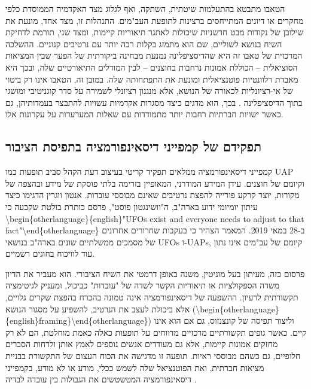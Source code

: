 \documentclass[12pt,a4paper]{article}
\begin{document}
הטאבו מתבטא בהתעלמות שיטתית, השתקה, ואף לגלוג מצד האקדמיה הממוסדת כלפי מחקרים או דיונים המתייחסים ברצינות לתופעת העב"מים. התנהלות זו, מצד אחד, מונעת את שילובן של נקודות מבט חדשניות שיכולות לאתגר תיאוריות קיימות, ומצד שני, תורמת לדחיקת השיח בנושא לשוליים, שם הוא מתמזג בקלות רבה יותר עם נרטיבים קנוניים. ההשלכה המרכזית של טאבו זה היא שהדיסציפלינה נמנעת מבחינה ביקורתית של הפער שבין המציאות הסוציאלית – הכוללת אמונות נרחבות בחוצנים – לבין המודלים התיאורטיים שלה, ובכך היא מאבדת רלוונטיות פוטנציאלית ומונעת את התפתחותה שלה. במובן זה, הטאבו אינו רק ביטוי של אי-רציונליות לכאורה של הנושא, אלא מנגנון רציונלי לשמירה על סדר קוגניטיבי ומושגי בתוך הדיסציפלינה \cite{Wendt2008}. בכך, הוא מדגים כיצד מסגרות אקדמיות עשויות להתבצר בעמדותיהן, גם כאשר ישויות חברתיות רחבות יותר מתמודדות עם שאלות המערערות על עקרונות אלו.

\subsection{תפקידם של קמפייני דיסאינפורמציה בתפיסת הציבור}
קמפייני דיסאינפורמציה ממלאים תפקיד קריטי בעיצוב דעת הקהל סביב תופעות כמו UAP וקיומם של חוצנים. עידן המידע המודרני, המאופיין בזרימה בלתי פוסקת של מידע ובהצפה של מקורות, יוצר קרקע פורייה להפצת נרטיבים שאינם מבוססי עובדות. אנטון ווגרין \cite{AntonVugrin2022} הדגימו כיצד עיתון יומיומי ידוע בארה"ב, ה"וושינגטון פוסט", פרסם כותרת בולטת שקבעה כי \textbackslash{}begin\{otherlanguage\}\{english\}"UFOs exist and everyone needs to adjust to that fact"\textbackslash{}end\{otherlanguage\} ב-28 במאי 2019. המאמר הצהיר כי בעקבות שחרורים אחרונים של מסמכים ממשלתיים שונים בארה"ב בנושאי UFOs ו-UAPs, קיומם של עב"מים אינו נתון עוד לוויכוח בחוגים רשמיים.

פרסום כזה, מעיתון בעל מוניטין, משנה באופן דרמטי את השיח הציבורי. הוא מעביר את הדיון משדה הספקולציות או תיאוריות הקשר לשדה של "עובדות" כביכול, ומעניק לגיטימציה תקשורתית לרעיון. ההשפעה של דיסאינפורמציה אינה טמונה בהכרח בהפצת שקרים גלויים, אלא ביכולת לעצב את הנרטיב, להשפיע על מסגור הנושא (\textbackslash{}begin\{otherlanguage\}\{english\}framing\}\textbackslash{}end\{otherlanguage\}) וליצור תפיסה של קונצנזוס, גם אם הוא אינו קיים. כאשר גופים תקשורתיים מרכזיים מדווחים על תופעות כאלה כאמת מוחלטת, הם לא רק מחזקים אמונות קיימות, אלא גם מעודדים אנשים נוספים לאמץ אותן ולדחות הסברים חלופיים, גם כשהם מבוססי ראיות. תופעה זו מדגישה את הכוח העצום של התקשורת בבניית מציאות חברתית, ואת הפוטנציאל שלה לשמש ככלי, מודע או לא מודע, בקמפייני דיסאינפורמציה המטשטשים את הגבולות בין עובדה לבדיה \cite{AntonVugrin2022}.
\end{document}
